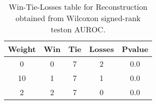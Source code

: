 \begin{table}[H]
\centering
\begin{tabular}{|c|c|c|c|c|}

\textbf{Weight} &  \textbf{Win} &  \textbf{Tie} &  \textbf{Losses} &  \textbf{Pvalue} \\
\hline

              0 &             0 &             7 &                2 &              0.0 \\
\hline
             10 &             1 &             7 &                1 &              0.0 \\
\hline
              2 &             2 &             7 &                0 &              0.0 \\
\hline

\end{tabular}
\caption{Win-Tie-Losses table for Reconstruction obtained from Wilcoxon signed-rank teston AUROC.}
\label{tab:reconstruction_weighted_cae_comparison}
\end{table}